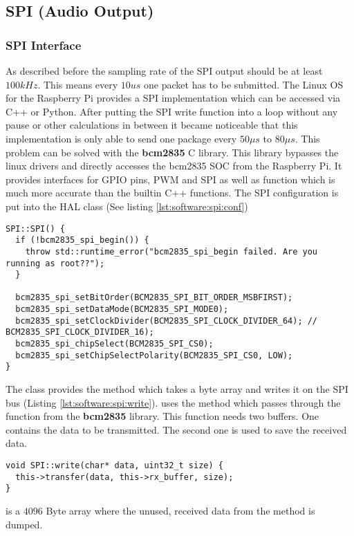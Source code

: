 \subsection{SPI (Audio Output)}

\subsubsection*{SPI Interface}

As described before the sampling rate of the SPI output should be at least $100kHz$. This means every $10us$ one packet has to be submitted. The Linux OS for the Raspberry Pi provides a SPI implementation which can be accessed via C++ or Python. After putting the SPI write function into a loop without any pause or other calculations in between it became noticeable that this implementation is only able to send one package every $50\mu s$ to $80\mu s$. This problem can be solved with the \textbf{bcm2835} C library.\cite{mccauley_bcm2835_nodate} This library bypasses the linux drivers and directly accesses the bcm2835 SOC from the Raspberry Pi. It provides interfaces for GPIO pins, PWM and SPI as well as  function which is much more accurate than the builtin C++ functions.\p
%
The SPI configuration is put into the HAL class  (See listing \ref{lst:software:spi:conf})
%
\begin{mdframed}
\begin{lstlisting}[caption=SPI configuration, label=lst:software:spi:conf]
SPI::SPI() {
  if (!bcm2835_spi_begin()) {
    throw std::runtime_error("bcm2835_spi_begin failed. Are you running as root??");
  }

  bcm2835_spi_setBitOrder(BCM2835_SPI_BIT_ORDER_MSBFIRST);
  bcm2835_spi_setDataMode(BCM2835_SPI_MODE0);
  bcm2835_spi_setClockDivider(BCM2835_SPI_CLOCK_DIVIDER_64); // BCM2835_SPI_CLOCK_DIVIDER_16);
  bcm2835_spi_chipSelect(BCM2835_SPI_CS0);
  bcm2835_spi_setChipSelectPolarity(BCM2835_SPI_CS0, LOW);
}
\end{lstlisting}
\end{mdframed}
%
The  class provides the method  which takes a byte array and writes it on the SPI bus (Listing \ref{lst:software:spi:write}).  uses the method  which passes through the function  from the \textbf{bcm2835} library. This function needs two buffers. One contains the data to be transmitted. The second one is used to save the received data.
%
\begin{mdframed}
\begin{lstlisting}[caption=Method for writing data onto the SPI bus, label=lst:software:spi:write]
void SPI::write(char* data, uint32_t size) {
  this->transfer(data, this->rx_buffer, size);
}
\end{lstlisting}
\end{mdframed}
%
 is a $4096$ Byte array where the unused, received data from the  method is dumped.
%
